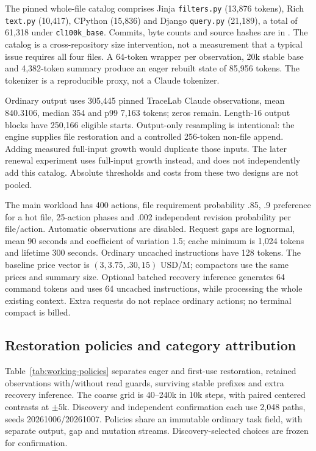 \documentclass[sigconf,screen,nonacm]{acmart}
\begin{document}
The pinned whole-file catalog comprises Jinja \texttt{filters.py} (13,876
tokens), Rich \texttt{text.py} (10,417), CPython
 (15,836) and Django \texttt{query.py}
(21,189), a total of 61,318 under \texttt{cl100k\_base}. Commits, byte
counts and source hashes are in .
The catalog is a cross-repository size intervention, not a measurement that
a typical issue requires all four files. A 64-token wrapper per observation,
20k stable base and 4,382-token summary produce an eager rebuilt state of
85,956 tokens. The tokenizer is a reproducible proxy, not a Claude tokenizer.

Ordinary output uses 305,445 pinned TraceLab Claude observations, mean
840.3106, median 354 and p99 7,163 tokens; zeros remain. Length-16 output
blocks have 250,166 eligible starts. Output-only resampling is intentional:
the engine supplies file restoration and a controlled 256-token non-file
append. Adding measured full-input growth would duplicate those inputs.
The later renewal experiment uses full-input growth instead, and does not
independently add this catalog. Absolute thresholds and costs from these
two designs are not pooled.

The main workload has 400 actions, file requirement probability .85,
.9 preference for a hot file, 25-action phases and .002 independent revision
probability per file/action. Automatic observations are disabled. Request
gaps are lognormal, mean 90 seconds and coefficient of variation 1.5;
cache minimum is 1,024 tokens and lifetime 300 seconds. Ordinary uncached
instructions have 128 tokens. The baseline price vector is
$(3,3.75,.30,15)$ USD/M; compactors use the same prices and summary size.
Optional batched recovery inference generates 64 command tokens and uses
64 uncached instructions, while processing the whole existing context.
Extra requests do not replace ordinary actions; no terminal compact is billed.

\subsection{Restoration policies and category attribution}
Table~\ref{tab:working-policies} separates eager and first-use restoration,
retained observations with/without read guards, surviving stable prefixes
and extra recovery inference. The coarse grid is 40--240k in 10k steps,
with paired centered contrasts at $\pm5$k. Discovery and independent
confirmation each use 2,048 paths, seeds 20261006/20261007. Policies share
an immutable ordinary task field, with separate output, gap and mutation
streams. Discovery-selected choices are frozen for confirmation.
\end{document}
